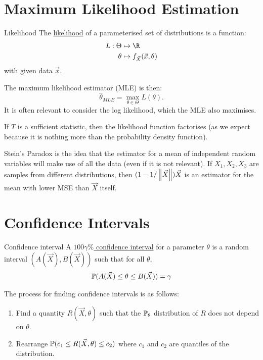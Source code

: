 \documentclass[../Main.tex]{subfiles}
\begin{document}
\section{Maximum Likelihood Estimation}
\begin{definition}{Likelihood}
    The \underline{likelihood} of a parameterised set of distributions is a function:
    \begin{align*}
        L : \Theta &\mapsto \R\\
        \theta &\mapsto f_{\vec{X}}(\vec{x}, \theta)
    \end{align*}
    with given data $\vec{x}$.
\end{definition}
The maximum likelihood estimator (MLE) is then:
\begin{equation*}
    \hat{\theta}_{MLE} = \max_{\theta \in \Theta} L(\theta).
\end{equation*}
It is often relevant to consider the log likelihood, which the MLE also maximises.

If $T$ is a sufficient statistic, then the likelihood function factorises (as we expect because it is nothing more than the probability density function).

Stein's Paradox is the idea that the estimator for a mean of independent random variables will make use of all the data (even if it is not relevant). If $X_1, X_2, X_3$ are samples from different distributions, then $(1 - 1/\norm{\vec{X}})\vec{X}$ is an estimator for the mean with lower MSE than $\vec{X}$ itself.
\section{Confidence Intervals}
\begin{definition}{Confidence interval}
    A \underline{$100\gamma\%$ confidence interval} for a parameter $\theta$ is a random interval $(A(\vec{X}), B(\vec{X}))$ such that for all $\theta$,
    \begin{equation*}
        \P(A(\vec{X}) \leq \theta \leq B(\vec{X})) = \gamma
    \end{equation*}
\end{definition}
The process for finding confidence intervals is as follows:
\begin{enumerate}
    \item Find a quantity $R(\vec{X}, \theta)$ such that the $\P_\theta$ distribution of $R$ does not depend on $\theta$.
    \item Rearrange $\P(c_1 \leq R(\vec{X}, \theta) \leq c_2)$ where $c_1$ and $c_2$ are quantiles of the distribution.
\end{enumerate}
\end{document}
